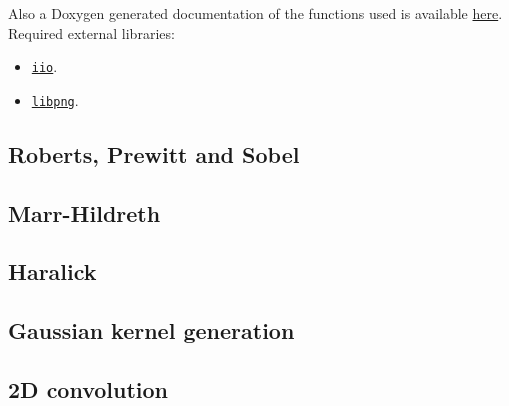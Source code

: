 \documentclass{ipol}
\numberwithin{equation}{section}
\numberwithin{table}{section}
\begin{document}
Also a Doxygen generated documentation of the functions used is available \href{http://iie.fing.edu.uy/~haldos/ipol/red_v0.1}{here}. \\

Required external libraries: 
\begin{itemize}
	\item \href{http://dev.ipol.im/git/coco/iio.git}{\texttt{iio}}.
	\item \href{http://www.libpng.org/}{\texttt{libpng}}. 
\end{itemize}

\subsection{Roberts, Prewitt and Sobel}


\subsection{Marr-Hildreth}
\label{app:marr-hildreth}


\subsection{Haralick}


\subsection{Gaussian kernel generation}


\subsection{2D convolution}


\clearpage



\end{document}
